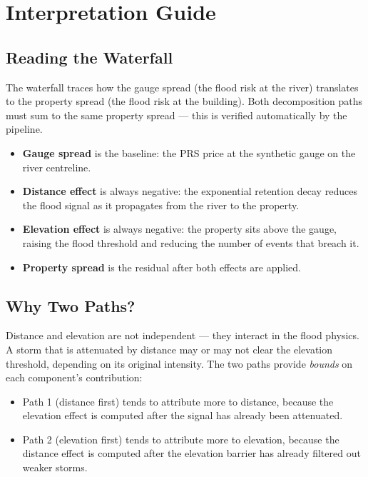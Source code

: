 \documentclass[11pt,a4paper]{article}
\begin{document}
\section{Interpretation Guide}

\subsection{Reading the Waterfall}

The waterfall traces how the gauge spread (the flood risk at the river) translates to
the property spread (the flood risk at the building). Both decomposition paths must sum
to the same property spread --- this is verified automatically by the pipeline.

\begin{itemize}[nosep]
    \item \textbf{Gauge spread} is the baseline: the PRS price at the synthetic gauge on
          the river centreline.
    \item \textbf{Distance effect} is always negative: the exponential retention decay
          reduces the flood signal as it propagates from the river to the property.
    \item \textbf{Elevation effect} is always negative: the property sits above the gauge,
          raising the flood threshold and reducing the number of events that breach it.
    \item \textbf{Property spread} is the residual after both effects are applied.
\end{itemize}

\subsection{Why Two Paths?}

Distance and elevation are not independent --- they interact in the flood physics. A
storm that is attenuated by distance may or may not clear the elevation threshold,
depending on its original intensity. The two paths provide \emph{bounds} on each
component's contribution:

\begin{itemize}[nosep]
    \item Path 1 (distance first) tends to attribute more to distance, because the
          elevation effect is computed after the signal has already been attenuated.
    \item Path 2 (elevation first) tends to attribute more to elevation, because the
          distance effect is computed after the elevation barrier has already filtered
          out weaker storms.
\end{itemize}
\end{document}
